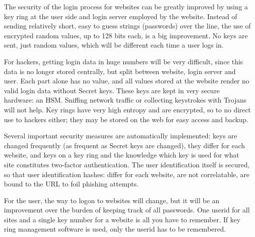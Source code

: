 The security of the login process for websites can be greatly improved by using a key ring
at the user side and login server employed by the website.
Instead of sending relatively short,
easy to guess strings
(passwords)
over the line,
the use of encrypted random values,
up to 128 bits each,
is a big improvement.
No keys are sent,
just random values,
which will be different each time a user logs in.
\par
For hackers,
getting login data in huge numbers will be very difficult,
since this data is no longer stored centrally,
but split between website,
login server and user.
Each part alone has no value,
and all values stored at the website render no valid login data without Secret keys.
These keys are kept in very secure hardware: an HSM.
Sniffing network traffic or collecting keystrokes with Trojans will not help.
Key rings have very high entropy and are encrypted,
so to no direct use to hackers either;
they may be stored on the web for easy access and backup.
\par
Several important security measures are automatically implemented:
keys are changed frequently
(as frequent as Secret keys are changed),
they differ for each website,
and keys on a key ring and the knowledge which key is used for what site constitutes two-factor authentication.
The user identification itself is secured,
so that user identification hashes:
differ for each website,
are not correlatable,
are bound to the URL to foil phishing attempts.
\par
For the user,
the way to logon to websites will change,
but it will be an improvement over the burden of keeping track of all passwords.
One userid for all sites and a single key number for a website is all you have to remember.
If key ring management software is used, only the userid has to be remembered.

